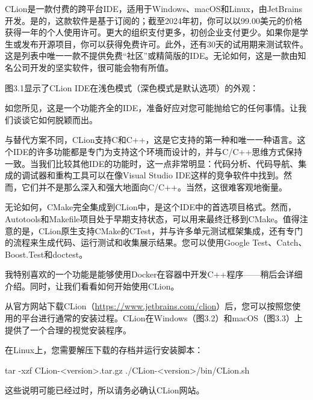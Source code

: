 
CLion是一款付费的跨平台IDE，适用于Windows、macOS和Linux，由JetBrains开发。是的，这款软件是基于订阅的；截至2024年初，你可以以99.00美元的价格获得一年的个人使用许可。更大的组织支付更多，初创企业支付更少。如果你是学生或发布开源项目，你可以获得免费许可。此外，还有30天的试用期来测试软件。这是列表中唯一一款不提供免费“社区”或精简版的IDE。无论如何，这是一款由知名公司开发的坚实软件，很可能会物有所值。

图3.1显示了CLion IDE在浅色模式（深色模式是默认选项）的外观：


如您所见，这是一个功能齐全的IDE，准备好应对您可能抛给它的任何事情。让我们谈谈它如何脱颖而出。


与替代方案不同，CLion支持C和C++，这是它支持的第一种和唯一一种语言。这个IDE的许多功能都是专门为支持这个环境而设计的，并与C/C++思维方式保持一致。当我们比较其他IDE的功能时，这一点非常明显：代码分析、代码导航、集成的调试器和重构工具可以在像Visual Studio IDE这样的竞争软件中找到。然而，它们并不是那么深入和强大地面向C/C++。当然，这很难客观地衡量。

无论如何，CMake完全集成到CLion中，是这个IDE中的首选项目格式。然而，Autotools和Makefile项目处于早期支持状态，可以用来最终迁移到CMake。值得注意的是，CLion原生支持CMake的CTest，并与许多单元测试框架集成，还有专门的流程来生成代码、运行测试和收集展示结果。您可以使用Google Test、Catch、Boost.Test和doctest。

我特别喜欢的一个功能是能够使用Docker在容器中开发C++程序——稍后会详细介绍。同时，让我们看看如何开始使用CLion。


从官方网站下载CLion（\url{https://www.jetbrains.com/clion}）后，您可以按照您使用的平台进行通常的安装过程。CLion在Windows（图3.2）和macOS（图3.3）上提供了一个合理的视觉安装程序。



在Linux上，您需要解压下载的存档并运行安装脚本：

\begin{shell}
tar -xzf CLion-<version>.tar.gz
./CLion-<version>/bin/CLion.sh
\end{shell}

这些说明可能已经过时，所以请务必确认CLion网站。

